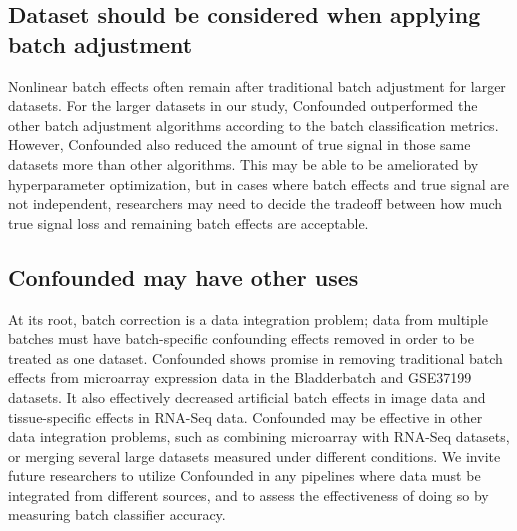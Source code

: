 \documentclass[notitlepage]{article}
\begin{document}
\subsection{Dataset should be considered when applying batch adjustment}

Nonlinear batch effects often remain after traditional batch adjustment for larger datasets.
For the larger datasets in our study, Confounded outperformed the other batch adjustment algorithms according to the batch classification metrics.
However, Confounded also reduced the amount of true signal in those same datasets more than other algorithms.
This may be able to be ameliorated by hyperparameter optimization,
but in cases where batch effects and true signal are not independent, researchers may need to decide the tradeoff between how much true signal loss and remaining batch effects are acceptable.

\subsection{Confounded may have other uses}

At its root, batch correction is a data integration problem;
data from multiple batches must have batch-specific confounding effects removed in order to be treated as one dataset.
Confounded shows promise in removing traditional batch effects from microarray expression data in the Bladderbatch and GSE37199 datasets.
It also effectively decreased artificial batch effects in image data and tissue-specific effects in RNA-Seq data.
Confounded may be effective in other data integration problems, such as combining microarray with RNA-Seq datasets, or merging several large datasets measured under different conditions.
We invite future researchers to utilize Confounded in any pipelines where data must be integrated from different sources, and to assess the effectiveness of doing so by measuring batch classifier accuracy.


\end{document}
